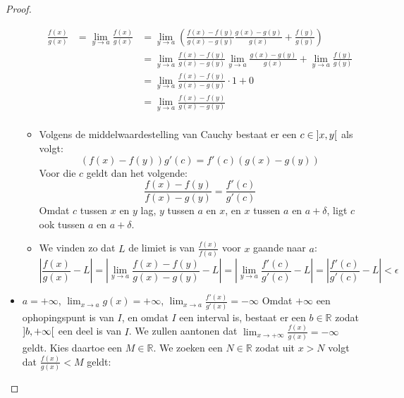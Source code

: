 \documentclass[main.tex]{subfiles}
\begin{document}
\begin{st}
\begin{proof}
\begin{itemize}
\begin{itemize}
\[        \begin{array}{rcl}
          \frac{f(x)}{g(x)}
          &= \lim_{y \rightarrow a}\frac{f(x)}{g(x)}
          &= \lim_{y \rightarrow a}\left(\frac{f(x)-f(y)}{g(x)-g(y)}\frac{g(x)-g(y)}{g(x)} + \frac{f(y)}{g(y)}\right)\\
          &&= \lim_{y \rightarrow a}\frac{f(x)-f(y)}{g(x)-g(y)}\lim_{y \rightarrow a}\frac{g(x)-g(y)}{g(x)} + \lim_{y \rightarrow a}\frac{f(y)}{g(y)}\\
          &&= \lim_{y \rightarrow a}\frac{f(x)-f(y)}{g(x)-g(y)} \cdot 1 + 0\\
          &&= \lim_{y \rightarrow a}\frac{f(x)-f(y)}{g(x)-g(y)}\\
        \end{array}
        \]
      \item 
        Volgens de middelwaardestelling van Cauchy bestaat er een $c\in \interval[open]{x}{y}$ als volgt:
        \[ \left( f(x) - f(y) \right) g'(c) = f'(c) \left( g(x) - g(y) \right) \]
        Voor die $c$ geldt dan het volgende:
        \[ \frac{f(x)-f(y)}{f(x)-g(y)} = \frac{f'(c)}{g'(c)} \]
        Omdat $c$ tussen $x$ en $y$ lag, $y$ tussen $a$ en $x$, en $x$ tussen $a$ en $a+\delta$, ligt $c$ ook tussen $a$ en $a+\delta$.
      \item 
        We vinden zo dat $L$ de limiet is van $\frac{f(x)}{f(a)}$ voor $x$ gaande naar $a$:
        \[ \left|\frac{f(x)}{g(x)}-L\right|
        = \left|\lim_{y \rightarrow a}\frac{f(x)-f(y)}{g(x)-g(y)} - L \right|
        = \left| \lim_{y\rightarrow a}\frac{f'(c)}{g'(c)} - L \right|
        = \left| \frac{f'(c)}{g'(c)} - L \right|< \epsilon
        \]
      \end{itemize}
    \item $a=+\infty$, $\lim_{x \rightarrow a}g(x) = +\infty$, $\lim_{x \rightarrow a}\frac{f'(x)}{g'(x)} = -\infty$
      Omdat $+\infty$ een ophopingspunt is van $I$, en omdat $I$ een interval is, bestaat er een $b\in \mathbb{R}$ zodat $\interval[open]{b}{+\infty}$ een deel is van $I$.
      We zullen aantonen dat $\lim_{x \rightarrow +\infty}\frac{f(x)}{g(x)} = -\infty$ geldt.
      Kies daartoe een $M \in \mathbb{R}$.
      We zoeken een $N\in \mathbb{R}$ zodat uit $x>N$ volgt dat $\frac{f(x)}{g(x)}<M$ geldt:
      \begin{itemize}

\end{itemize}
\end{itemize}
\end{proof}
\end{st}
\end{document}
